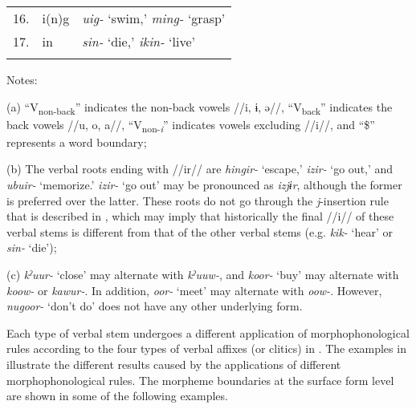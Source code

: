 \begin{table}
\begin{tabular}{lll}
16.&  i(n)g                                            &     \textit{uig-} ‘swim,’ \textit{ming-} ‘grasp’                                                                                                                                                                                                     \\
17.&  in                                               &     \textit{sin-} ‘die,’ \textit{ikin-} ‘live’                                                                                                                                                                                                       \\
\lspbottomrule
\end{tabular}
Notes:

(a) “V\textsubscript{non-back}” indicates the non-back vowels //i, ɨ, ə//, “V\textsubscript{back}” indicates the back vowels //u, o, a//, “V\textsubscript{non-}\textit{\textsubscript{i}}” indicates vowels excluding //i//, and “\$” represents a word boundary;

(b) The verbal roots ending with //ir// are \textit{hingir-} ‘escape,’ \textit{izir-} ‘go out,’ and \textit{ubuir-} ‘memorize.’ \textit{izir-} ‘go out’ may be pronounced as \textit{izjɨr}, although the former is preferred over the latter. These roots do not go through the \textit{j}-insertion rule that is described in , which may imply that historically the final //i// of these verbal stems is different from that of the other verbal stems (e.g. \textit{kik-} ‘hear’ or \textit{sin-} ‘die’);

(c) \textit{kˀuur-} ‘close’ may alternate with \textit{kˀuuw-}, and \textit{koor-} ‘buy’ may alternate with \textit{koow-} or \textit{kawur-}. In addition, \textit{oor-} ‘meet’ may alternate with \textit{oow-}. However, \textit{nugoor-} ‘don’t do’ does not have any other underlying form.
\end{table}

Each type of verbal stem undergoes a different application of morphophonological rules according to the four types of verbal affixes (or clitics) in . The examples in  illustrate the different results caused by the applications of different morphophonological rules. The morpheme boundaries at the surface form level are shown in some of the following examples.

